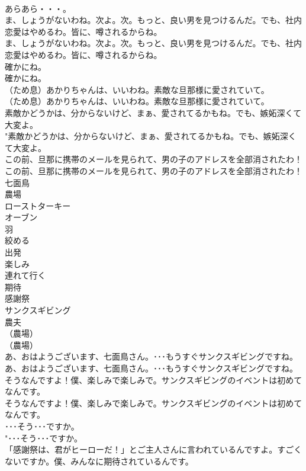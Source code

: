\documentclass[8pt]{extreport}
\begin{document}
\begin{CJK}{UTF8}{min}
\\	あらあら・・・。 
\\	ま、しょうがないわね。次よ。次。もっと、良い男を見つけるんだ。でも、社内恋愛はやめるわ。皆に、噂されるからね。	
\\	ま、しょうがないわね。次よ。次。もっと、良い男を見つけるんだ。でも、社内恋愛はやめるわ。皆に、噂されるからね。 
\\	確かにね。	
\\	確かにね。 
\\	（ため息）あかりちゃんは、いいわね。素敵な旦那様に愛されていて。	
\\	（ため息）あかりちゃんは、いいわね。素敵な旦那様に愛されていて。 
\\	素敵かどうかは、分からないけど、まぁ、愛されてるかもね。でも、嫉妬深くて大変よ。	
\\	"素敵かどうかは、分からないけど、まぁ、愛されてるかもね。でも、嫉妬深くて大変よ。 
\\	この前、旦那に携帯のメールを見られて、男の子のアドレスを全部消されたわ！	
\\	この前、旦那に携帯のメールを見られて、男の子のアドレスを全部消されたわ！ 
\\	七面鳥
\\	農場
\\	ローストターキー
\\	オーブン
\\	羽
\\	絞める
\\	出発
\\	楽しみ
\\	連れて行く
\\	期待
\\	感謝祭
\\	サンクスギビング
\\	農夫
\\	（農場）	
\\	（農場） 
\\	あ、おはようございます、七面鳥さん。･･･もうすぐサンクスギビングですね。	
\\	あ、おはようございます、七面鳥さん。･･･もうすぐサンクスギビングですね。 
\\	そうなんですよ！僕、楽しみで楽しみで。サンクスギビングのイベントは初めてなんです。	
\\	そうなんですよ！僕、楽しみで楽しみで。サンクスギビングのイベントは初めてなんです。 
\\	･･･そう･･･ですか。	
\\	"･･･そう･･･ですか。 
\\	「感謝祭は、君がヒーローだ！」とご主人さんに言われているんですよ。すごくないですか。僕、みんなに期待されているんです。	

\end{CJK}
\end{document}
